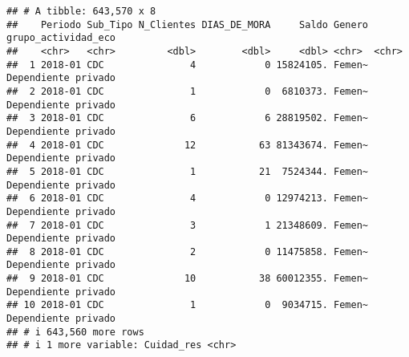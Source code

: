 \documentclass[
]{book}
\newenvironment{Shaded}{\begin{snugshade}}{\end{snugshade}}
\newcommand{\AttributeTok}[1]{\textcolor[rgb]{0.77,0.63,0.00}{#1}}
\newcommand{\CommentTok}[1]{\textcolor[rgb]{0.56,0.35,0.01}{\textit{#1}}}
\newcommand{\DecValTok}[1]{\textcolor[rgb]{0.00,0.00,0.81}{#1}}
\newcommand{\FunctionTok}[1]{\textcolor[rgb]{0.00,0.00,0.00}{#1}}
\newcommand{\NormalTok}[1]{#1}
\newcommand{\OtherTok}[1]{\textcolor[rgb]{0.56,0.35,0.01}{#1}}
\newcommand{\SpecialCharTok}[1]{\textcolor[rgb]{0.00,0.00,0.00}{#1}}
\newcommand{\StringTok}[1]{\textcolor[rgb]{0.31,0.60,0.02}{#1}}
\begin{document}
\begin{verbatim}
## # A tibble: 643,570 x 8
##    Periodo Sub_Tipo N_Clientes DIAS_DE_MORA     Saldo Genero grupo_actividad_eco
##    <chr>   <chr>         <dbl>        <dbl>     <dbl> <chr>  <chr>              
##  1 2018-01 CDC               4            0 15824105. Femen~ Dependiente privado
##  2 2018-01 CDC               1            0  6810373. Femen~ Dependiente privado
##  3 2018-01 CDC               6            6 28819502. Femen~ Dependiente privado
##  4 2018-01 CDC              12           63 81343674. Femen~ Dependiente privado
##  5 2018-01 CDC               1           21  7524344. Femen~ Dependiente privado
##  6 2018-01 CDC               4            0 12974213. Femen~ Dependiente privado
##  7 2018-01 CDC               3            1 21348609. Femen~ Dependiente privado
##  8 2018-01 CDC               2            0 11475858. Femen~ Dependiente privado
##  9 2018-01 CDC              10           38 60012355. Femen~ Dependiente privado
## 10 2018-01 CDC               1            0  9034715. Femen~ Dependiente privado
## # i 643,560 more rows
## # i 1 more variable: Cuidad_res <chr>
\end{verbatim}

\begin{Shaded}
\end{Shaded}
\end{document}
